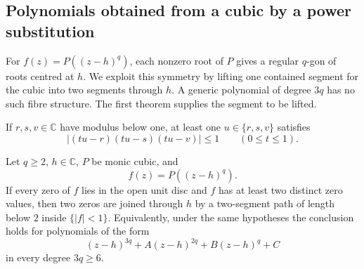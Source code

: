 \subsection{Polynomials obtained from a cubic by a power substitution}
\label{subsec:translated-cubic-quotient-fibres}

For $f(z)=P((z-h)^q)$, each nonzero root of $P$ gives a regular
$q$-gon of roots centred at $h$. We exploit this symmetry by lifting
one contained segment for the cubic into two segments through $h$.
A generic polynomial of degree $3q$ has no such fibre structure.
The first theorem supplies the segment to be lifted.

\begin{theorem}
\label{lem:cubic-safe-root-spoke}
If $r,s,v\in\mathbb C$ have modulus below one, at least one
$u\in\{r,s,v\}$ satisfies
\[
 \left|(tu-r)(tu-s)(tu-v)\right|\le1
 \qquad(0\le t\le1).
\]
\end{theorem}

\begin{theorem}
\label{thm:translated-cubic-quotient-fibres}
Let $q\ge2$, $h\in\mathbb C$, $P$ be monic cubic, and
\[
 f(z)=P((z-h)^q).
\]
If every zero of $f$ lies in the open unit disc and $f$ has at least two
distinct zero values, then two zeros are joined through $h$ by a two-segment
path of length below $2$ inside $\{|f|<1\}$. Equivalently, under the same
hypotheses the conclusion holds for polynomials of the form
\[
 (z-h)^{3q}+A(z-h)^{2q}+B(z-h)^q+C
\]
in every degree $3q\ge6$.
\end{theorem}

